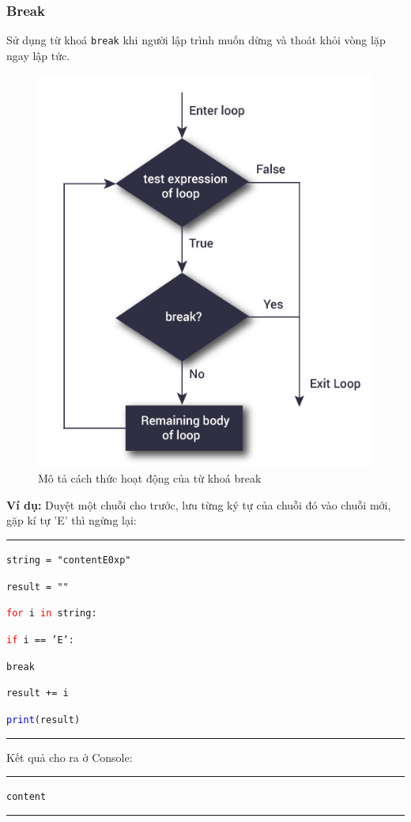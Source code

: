 \subsubsection{Break}
Sử dụng từ khoá \texttt{break} khi người lập trình muốn dừng và thoát khỏi vòng lặp ngay lập tức.\par
\begin{figure}[h]
	\centering
	\includegraphics[width=0.4\linewidth]{img/break}
	\caption{Mô tả cách thức hoạt động của từ khoá break}
\end{figure}
\noindent
\textbf{Ví dụ:} Duyệt một chuỗi cho trước, lưu từng ký tự của chuỗi đó vào chuỗi mới, gặp kí tự 'E' thì ngừng lại:\\
\rule{\linewidth}{0.2mm}\par
\begin{linenumbers}
	\texttt{string = "contentE0xp"}\par
	\texttt{result = ""}\par
	\texttt{\textcolor{red}{for} i \textcolor{red}{in} string:}\par
	\qquad\texttt{\textcolor{red}{if} i == 'E':}\par
	\qquad\qquad\texttt{break}\par
	\qquad\texttt{result += i}\par
	\texttt{\textcolor{blue}{print}(result)}\par
\end{linenumbers}
\rule{\linewidth}{0.2mm}\par
\noindent
\resetlinenumber
Kết quả cho ra ở Console:\\
\rule{\linewidth}{0.2mm}\par
\begin{linenumbers}
	\texttt{content}\par
\end{linenumbers}
\rule{\linewidth}{0.2mm}\par
\resetlinenumber
\newpage

